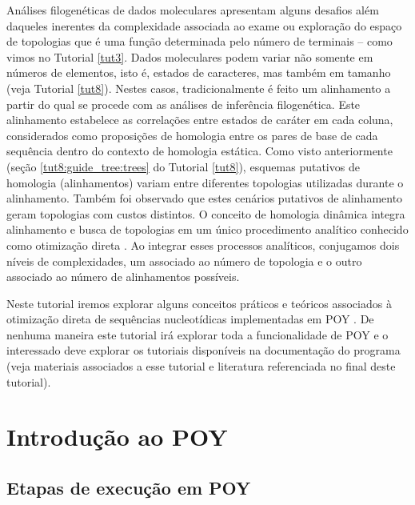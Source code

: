 \begin{refsection}
Análises filogenéticas de dados moleculares apresentam alguns desafios além daqueles inerentes da complexidade associada ao exame ou exploração do espaço de topologias que é uma função determinada pelo número de terminais -- como vimos no Tutorial \ref{tut3}. Dados moleculares podem variar não somente em números de elementos, isto é, estados de caracteres, mas também em tamanho (veja Tutorial \ref{tut8}). Nestes casos, tradicionalmente é feito um alinhamento a partir do qual se procede com as análises de inferência filogenética. Este alinhamento estabelece as correlações entre estados de caráter em cada coluna, considerados como proposições de homologia entre os pares de base de cada sequência dentro do contexto de homologia estática. Como visto anteriormente (seção \ref{tut8:guide_tree:trees} do Tutorial \ref{tut8}), esquemas putativos de homologia (alinhamentos) variam entre diferentes topologias utilizadas durante o alinhamento. Também foi observado que estes cenários putativos de alinhamento geram topologias com custos distintos. O conceito de homologia dinâmica \parencite[senso ][]{Wheeler_2001} integra alinhamento e busca de topologias em um único procedimento analítico conhecido como otimização direta \parencite[\textit{direct optimization};][]{Wheeler_1996}. Ao integrar esses processos analíticos, conjugamos dois níveis de complexidades, um associado ao número de topologia e o outro associado ao número de alinhamentos possíveis. 

Neste tutorial iremos explorar alguns conceitos práticos e teóricos associados à otimização direta de sequências nucleotídicas implementadas em POY \parencite[][]{VaronETAL_2010, VaronETAL_2014}. De nenhuma maneira este tutorial irá explorar toda a funcionalidade de POY e o interessado deve explorar os tutoriais disponíveis na documentação do programa (veja materiais associados a esse tutorial e literatura referenciada no final deste tutorial).

\section{Introdução ao POY}\label{tut9:context}

\subsection{Etapas de execução em POY}\label{tut9:context:steps}


\end{refsection}
